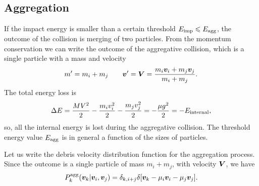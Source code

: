 \documentclass[aps,prl,preprint,groupedaddress,10pt]{revtex4-2}
\begin{document}
\subsection{Aggregation}
If the impact energy is smaller than a certain threshold
$E_{\mathrm{imp}}\leqslant E_{\mathrm{agg}}$, the outcome of the collision is merging of two
particles. From the momentum conservation we can write the outcome of the aggregative
collision, which is a single particle with a mass and velocity
\begin{equation}
    m'=m_i+m_j\qquad\vb*{v}'=\vb*{V}=\frac{m_i\vb*{v}_i+m_j\vb*{v}_j}{m_i+m_j}.
\end{equation}
The total energy loss is
\begin{equation}
    \Delta E=\frac{MV^2}{2}-\frac{m_iv_i^2}{2}-\frac{m_jv_j^2}{2}
    =-\frac{\mu g^2}{2}=-E_{\mathrm{internal}},
\end{equation}
so, all the internal energy is lost during the aggregative collision.
The threshold energy value $E_{\mathrm{agg}}$ is in general a function of the sizes of
particles.

Let us write the debris velocity distribution function for the aggregation process.
Since the outcome is a single particle of mass $m_i+m_j$, with velocity $\vb*{V}$, we have
\begin{equation}
    \utx{P_k}{agg}\pqty{\bv_k\vert\bv_i,\bv_j}=\delta_{k,i+j}
    \delta\bqty{\bv_k-\mu_i\bv_i-\mu_j\bv_j}.
\end{equation}
\end{document}
